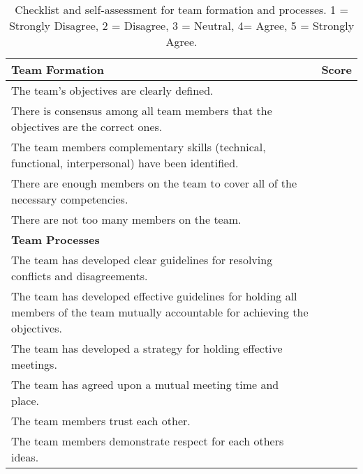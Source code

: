 \begin{table}
\caption{Checklist and self-assessment for team formation and
processes. 1 = Strongly Disagree, 2 = Disagree, 3 = Neutral, 4= Agree, 5
= Strongly Agree.}
\label{table:teamCheckList}
\begin{tabular}{|m{15cm}|l|}
\hline
\rowcolor{Gray}
\textbf{Team Formation} & \textbf{Score} \\ \hline
The team's objectives are clearly defined. & \\ \hline
There is consensus among all team members that the objectives are the
correct ones. & \\ \hline
The team members complementary skills (technical, functional,
interpersonal) have been identified. & \\ \hline
There are enough members on the team to cover all of the necessary
competencies. & \\ \hline
There are not too many members on the team. & \\ \hline
\rowcolor{Gray}
\textbf{Team Processes} & \\ \hline
The team has developed clear guidelines for resolving conflicts and
disagreements. & \\ \hline
The team has developed effective guidelines for holding all members of
the team mutually accountable for achieving the objectives. & \\ \hline
The team has developed a strategy for holding effective meetings. & \\ \hline
The team has agreed upon a mutual meeting time and place. & \\ \hline
The team members trust each other. & \\ \hline
The team members demonstrate respect for each others ideas. & \\ \hline
\end{tabular}
\end{table}
